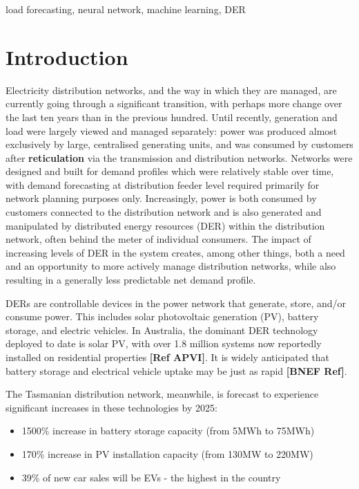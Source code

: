 \documentclass[conference]{IEEEtran}
\begin{document}
\begin{IEEEkeywords}
load forecasting, neural network, machine learning, DER
\end{IEEEkeywords}

\section{Introduction}
Electricity distribution networks, and the way in which they are managed, are currently going through a significant transition, with perhaps more change over the last ten years than in the previous hundred. %
Until recently, generation and load were largely viewed and managed separately: power was produced almost exclusively by large, centralised generating units, and was consumed by customers after \textbf{reticulation} via %
the transmission and distribution networks. 
Networks were designed and built for demand profiles which were relatively stable over time, with demand forecasting at distribution feeder level required primarily for network planning purposes only. 
Increasingly, power is both consumed by customers connected to the distribution network and is also generated and manipulated by distributed energy resources (DER) within the distribution network, often behind the meter of individual consumers. 
The impact of increasing levels of DER in the system creates, among other things, both a need and an opportunity to more actively manage distribution networks, while also resulting in a generally less predictable net demand profile.

DERs are controllable devices in the power network that generate, store, and/or consume power. 
This includes solar photovoltaic generation (PV), battery storage, and electric vehicles. 
In Australia, the dominant DER technology deployed to date is solar PV, with over 1.8 million systems now reportedly installed on residential properties \textbf{[Ref APVI]}. 
It is widely anticipated that battery storage and electrical vehicle uptake may be just as rapid \textbf{[BNEF Ref]}.

The Tasmanian distribution network, meanwhile, is forecast to experience significant increases in these technologies by 2025: \\
\begin{itemize}
	\item 1500\% increase in battery storage capacity (from 5MWh to 75MWh) \cite{Jacobs2017}
	\item 170\% increase in PV installation capacity (from 130MW to 220MW) \cite{Jacobs2017}
	\item 39\% of new car sales will be EVs - the highest in the country \cite{AEMO2016}
\end{itemize}
\end{document}
